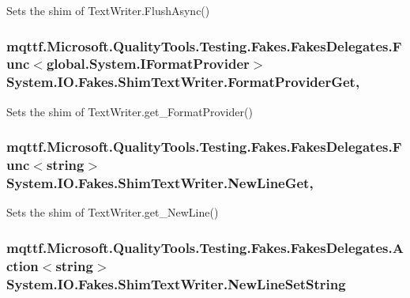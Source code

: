 Sets the shim of Text\-Writer.\-Flush\-Async()

\hypertarget{class_system_1_1_i_o_1_1_fakes_1_1_shim_text_writer_a20ebc01ccd055cf18a8a2d1cbbfe7b43}{
\subsubsection[{Format\-Provider\-Get}]{\setlength{\rightskip}{0pt plus 5cm}mqttf.\-Microsoft.\-Quality\-Tools.\-Testing.\-Fakes.\-Fakes\-Delegates.\-Func$<$global.\-System.\-I\-Format\-Provider$>$ System.\-I\-O.\-Fakes.\-Shim\-Text\-Writer.\-Format\-Provider\-Get\hspace{0.3cm}{\ttfamily [get]}, {\ttfamily [set]}}}\label{class_system_1_1_i_o_1_1_fakes_1_1_shim_text_writer_a20ebc01ccd055cf18a8a2d1cbbfe7b43}


Sets the shim of Text\-Writer.\-get\-\_\-\-Format\-Provider()

\hypertarget{class_system_1_1_i_o_1_1_fakes_1_1_shim_text_writer_a64f0e1afbca9129d9bb29a1f6272de92}{
\subsubsection[{New\-Line\-Get}]{\setlength{\rightskip}{0pt plus 5cm}mqttf.\-Microsoft.\-Quality\-Tools.\-Testing.\-Fakes.\-Fakes\-Delegates.\-Func$<$string$>$ System.\-I\-O.\-Fakes.\-Shim\-Text\-Writer.\-New\-Line\-Get\hspace{0.3cm}{\ttfamily [get]}, {\ttfamily [set]}}}\label{class_system_1_1_i_o_1_1_fakes_1_1_shim_text_writer_a64f0e1afbca9129d9bb29a1f6272de92}


Sets the shim of Text\-Writer.\-get\-\_\-\-New\-Line()

\hypertarget{class_system_1_1_i_o_1_1_fakes_1_1_shim_text_writer_af62d7a51c465b0be210b0556d08ead93}{
\subsubsection[{New\-Line\-Set\-String}]{\setlength{\rightskip}{0pt plus 5cm}mqttf.\-Microsoft.\-Quality\-Tools.\-Testing.\-Fakes.\-Fakes\-Delegates.\-Action$<$string$>$ System.\-I\-O.\-Fakes.\-Shim\-Text\-Writer.\-New\-Line\-Set\-String\hspace{0.3cm}{\ttfamily [set]}}}\label{class_system_1_1_i_o_1_1_fakes_1_1_shim_text_writer_af62d7a51c465b0be210b0556d08ead93}


